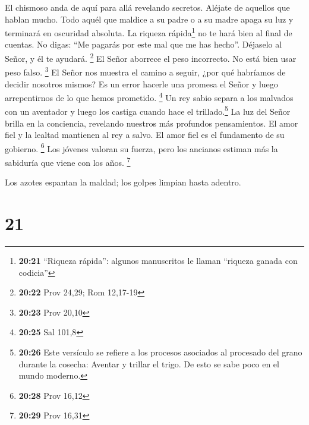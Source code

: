  El chismoso anda de aquí para allá revelando secretos.
Aléjate de aquellos que hablan mucho.  Todo aquél que
maldice a su padre o a su madre apaga su luz y terminará en oscuridad
absoluta.  La riqueza rápida\footnote{\textbf{20:21}
  ``Riqueza rápida'': algunos manuscritos le llaman ``riqueza ganada con
  codicia''} no te hará bien al final de cuentas.  No
digas: ``Me pagarás por este mal que me has hecho''. Déjaselo al Señor,
y él te ayudará. \footnote{\textbf{20:22} Prov 24,29; Rom 12,17-19}
 El Señor aborrece el peso incorrecto. No está bien usar
peso falso. \footnote{\textbf{20:23} Prov 20,10}  El
Señor nos muestra el camino a seguir, ¿por qué habríamos de decidir
nosotros mismos?  Es un error hacerle una promesa el
Señor y luego arrepentirnos de lo que hemos prometido. \footnote{\textbf{20:25}
  Sal 101,8}  Un rey sabio separa a los malvados con un
aventador y luego los castiga cuando hace el trillado.\footnote{\textbf{20:26}
  Este versículo se refiere a los procesos asociados al procesado del
  grano durante la cosecha: Aventar y trillar el trigo. De esto se sabe
  poco en el mundo moderno.}  La luz del Señor brilla en
la conciencia, revelando nuestros más profundos pensamientos.
 El amor fiel y la lealtad mantienen al rey a salvo. El
amor fiel es el fundamento de su gobierno. \footnote{\textbf{20:28} Prov
  16,12}  Los jóvenes valoran su fuerza, pero los
ancianos estiman más la sabiduría que viene con los años. \footnote{\textbf{20:29}
  Prov 16,31}

 Los azotes espantan la maldad; los golpes limpian hasta
adentro.

\hypertarget{section-20}{%
\section{21}\label{section-20}}

